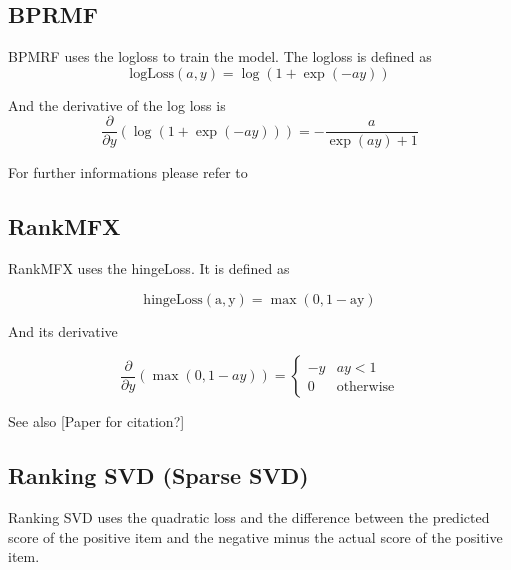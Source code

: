 \subsection{BPRMF}

BPMRF uses the logloss to train the model. The logloss is defined
as
\[
\textrm{logLoss}(a,y)=\log(1+\exp(-ay))
\]


And the derivative of the log loss is
\[
\frac{\partial}{\partial y}(\log(1+\exp(-ay)))=-\frac{a}{\exp(ay)+1}
\]


For further informations please refer to \cite{Rendle:2009:BBP:1795114.1795167}


\subsection{RankMFX}

RankMFX uses the hingeLoss. It is defined as

\[
\mathrm{\textrm{hingeLoss}(a,y)=\max(0,1-ay)}
\]


And its derivative

\[
\frac{\partial}{\partial y}(\max(0,1-ay))=\begin{cases}
-y & ay<1\\
0 & \textrm{otherwise}
\end{cases}
\]


See also {[}Paper for citation?{]}


\subsection{Ranking SVD (Sparse SVD)}

Ranking SVD uses the quadratic loss and the difference between the
predicted score of the positive item and the negative minus the actual
score of the positive item.\cite{jahrer2011collaborative}
